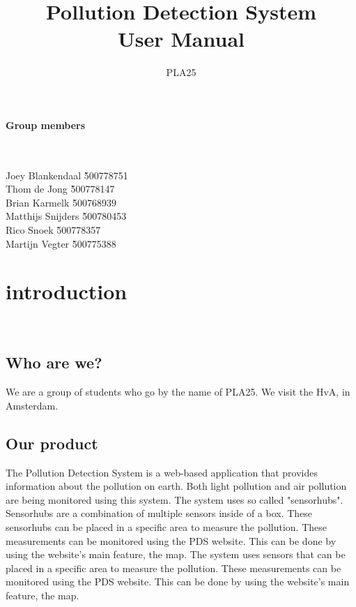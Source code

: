 \documentclass[a4paper]{article}
\title{Pollution Detection System\\User Manual}
\author{PLA25}
\begin{document}
\maketitle
\vspace*{\fill}

\paragraph{Group members}
~\newline
\begin{tabbing}
Joey Blankendaal \` 500778751
\\
Thom de Jong \` 500778147
\\
Brian Karmelk \` 500768939
\\
Matthijs Snijders \` 500780453
\\
Rico Snoek \` 500778357
\\
Martijn Vegter \` 500775388
\end{tabbing}
% 
% 
\thispagestyle{empty}
\pagebreak
\tableofcontents
\pagebreak

\section{introduction}
~\newline

\subsection{Who are we?}
We are a group of students who go by the name of PLA25. We visit the HvA, in Amsterdam.
~\newline

\subsection{Our product}
The Pollution Detection System is a web-based application that provides information about the pollution on earth. Both light pollution and air pollution are being monitored using this system.
\newline
The system uses so called "sensorhubs". Sensorhubs are a combination of multiple sensors inside of a box. These sensorhubs can be placed in a specific area to measure the pollution. These measurements can be monitored using the PDS website. This can be done by using the website's main feature, the map.
The system uses sensors that can be placed in a specific area to measure the pollution. These measurements can be monitored using the PDS website. This can be done by using the website's main feature, the map.
\end{document}
